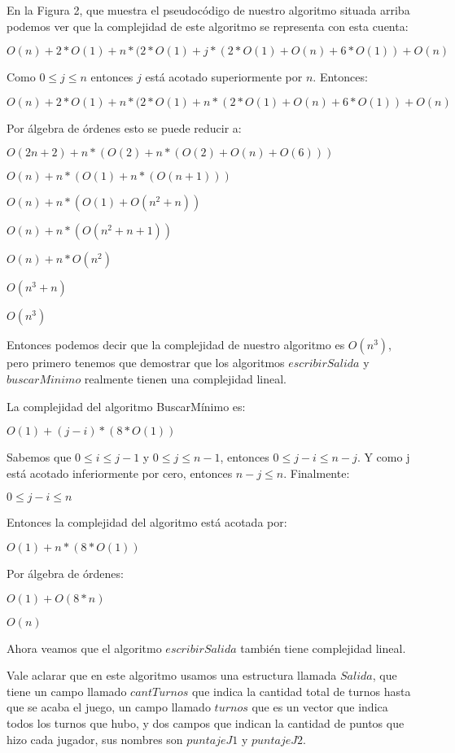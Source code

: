 En la Figura 2, que muestra el pseudocódigo de nuestro algoritmo situada arriba podemos ver que la complejidad de este algoritmo se representa con esta cuenta:

$O(n) + 2*O(1) + n*(2*O(1) + j*(2*O(1) +O(n) + 6*O(1)) + O(n)$

Como $0 \leq j \leq n$ entonces $j$ está acotado superiormente por $n$. Entonces:

$O(n) + 2*O(1) + n*(2*O(1) + n*(2*O(1) +O(n) + 6*O(1)) + O(n)$

Por álgebra de órdenes esto se puede reducir a:

$O(2n+2) + n*(O(2) + n*(O(2) + O(n) + O (6)))$

$O(n) + n*(O(1) + n*(O(n+1)))$

$O(n) + n*(O(1) + O(n^2+n))$

$O(n) + n*(O(n^2 +n +1))$

$O(n) + n*O(n^2)$

$O(n^3+n)$

$O(n^3)$

Entonces podemos decir que la complejidad de nuestro algoritmo es $O(n^3)$, pero primero tenemos que demostrar que los algoritmos $escribirSalida$ y $buscarMinimo$ realmente tienen una complejidad lineal.


La complejidad del algoritmo BuscarMínimo es:

$O(1) + (j-i)*(8*O(1))$

Sabemos que $0 \leq i \leq j-1$ y $0 \leq j \leq n-1$, entonces $0 \leq j-i \leq n-j$. Y como j está acotado inferiormente por cero, entonces $n-j \leq n$. Finalmente:

$0 \leq j-i \leq n$

Entonces la complejidad del algoritmo está acotada por:

$O(1) + n*(8*O(1))$

Por álgebra de órdenes:

$O(1) + O(8*n)$

$O(n)$

Ahora veamos que el algoritmo $escribirSalida$ también tiene complejidad lineal.

Vale aclarar que en este algoritmo usamos una estructura llamada $Salida$, que tiene un campo llamado $cantTurnos$ que indica la cantidad total de turnos hasta que se acaba el juego, un campo llamado $turnos$ que es un vector que indica todos los turnos que hubo, y dos campos que indican la cantidad de puntos que hizo cada jugador, sus nombres son $puntajeJ1$ y $puntajeJ2$.

